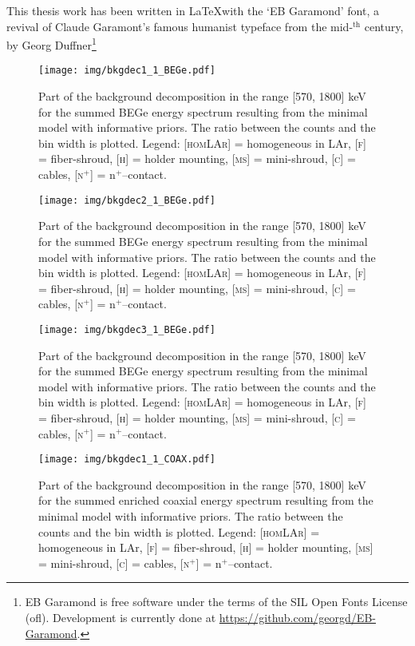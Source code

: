 This thesis work has been written in \LaTeX with the `EB Garamond' font, a revival of Claude Garamont's famous humanist typeface from the mid-$^\text{th}$ century, by Georg Duffner\footnote{EB Garamond is free software under the terms of the SIL Open Fonts License (ofl). Development is currently done at \url{https://github.com/georgd/EB-Garamond}.}
\begin{landscape}
	\begin{figure}
		\centering
		\texttt{[image: img/bkgdec1\_1\_BEGe.pdf]}
		\caption{Part of the background decomposition in the range [570, 1800] keV for the summed BEGe energy spectrum resulting from the minimal model with informative priors. The ratio between the counts and the bin width is plotted. Legend: \textsc{[homLAr]} = homogeneous in LAr, \textsc{[f]} = fiber-shroud, \textsc{[h]} = holder mounting, \textsc{[ms]} = mini-shroud, \textsc{[c]} = cables, \textsc{[n$^+$]} = n$^+$--contact.}
	\end{figure}
	\begin{figure}
		\centering
		\texttt{[image: img/bkgdec2\_1\_BEGe.pdf]}
		\caption{Part of the background decomposition in the range [570, 1800] keV for the summed BEGe energy spectrum resulting from the minimal model with informative priors. The ratio between the counts and the bin width is plotted. Legend: \textsc{[homLAr]} = homogeneous in LAr, \textsc{[f]} = fiber-shroud, \textsc{[h]} = holder mounting, \textsc{[ms]} = mini-shroud, \textsc{[c]} = cables, \textsc{[n$^+$]} = n$^+$--contact.}
	\end{figure}
	\begin{figure}
		\centering
		\texttt{[image: img/bkgdec3\_1\_BEGe.pdf]}
		\caption{Part of the background decomposition in the range [570, 1800] keV for the summed BEGe energy spectrum resulting from the minimal model with informative priors. The ratio between the counts and the bin width is plotted. Legend: \textsc{[homLAr]} = homogeneous in LAr, \textsc{[f]} = fiber-shroud, \textsc{[h]} = holder mounting, \textsc{[ms]} = mini-shroud, \textsc{[c]} = cables, \textsc{[n$^+$]} = n$^+$--contact.}
	\end{figure}
	\begin{figure}
		\centering
		\texttt{[image: img/bkgdec1\_1\_COAX.pdf]}
		\caption{Part of the background decomposition in the range [570, 1800] keV for the summed enriched coaxial energy spectrum resulting from the minimal model with informative priors. The ratio between the counts and the bin width is plotted. Legend: \textsc{[homLAr]} = homogeneous in LAr, \textsc{[f]} = fiber-shroud, \textsc{[h]} = holder mounting, \textsc{[ms]} = mini-shroud, \textsc{[c]} = cables, \textsc{[n$^+$]} = n$^+$--contact.}

\end{figure}
\end{landscape}
